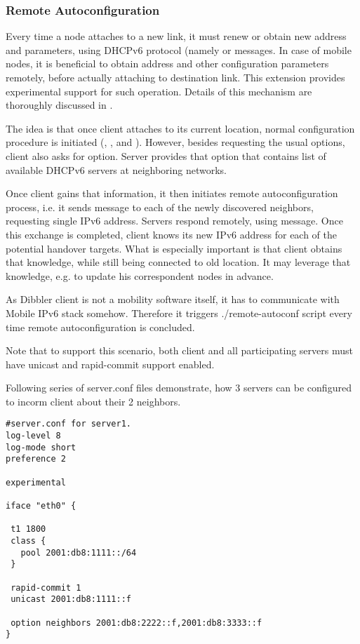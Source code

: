 \subsubsection{Remote Autoconfiguration}
\label{feature-remote-autoconf}
Every time a node attaches to a new link, it must renew or
obtain new address and parameters, using DHCPv6 protocol (namely
 or  messages.  In case of mobile nodes,
it is beneficial to obtain address and other  configuration parameters
remotely, before actually attaching to destination link.  This
extension provides experimental support for such operation.
Details of this mechanism are thoroughly discussed in \cite{phd,
  draft-remote-autoconf, networks2010, atnac2010}.

The idea is that once client attaches to its current location, normal
configuration procedure is initiated (, ,
 and ). However, besides requesting the usual
options, client also asks for  option. Server provides
that option that contains list of available DHCPv6 servers at
neighboring networks.

Once client gains that information, it then initiates remote
autoconfiguration process, i.e. it sends  message to each
of the newly discovered neighbors, requesting single IPv6
address. Servers respond remotely, using  message. Once
this exchange is completed, client knows its new IPv6 address for each
of the potential handover targets. What is especially important is
that client obtains that knowledge, while still being connected to old
location. It may leverage that knowledge, e.g. to update his
correspondent nodes in advance.

As Dibbler client is not a mobility software itself, it has to
communicate with Mobile IPv6 stack somehow. Therefore it triggers
./remote-autoconf script every time remote autoconfiguration is
concluded.

Note that to support this scenario, both client and all participating
servers must have unicast and rapid-commit support enabled.

Following series of server.conf files demonstrate, how 3 servers can
be configured to incorm client about their 2 neighbors.

\begin{lstlisting}
#server.conf for server1.
log-level 8
log-mode short
preference 2

experimental

iface "eth0" {

 t1 1800
 class {
   pool 2001:db8:1111::/64
 }

 rapid-commit 1
 unicast 2001:db8:1111::f

 option neighbors 2001:db8:2222::f,2001:db8:3333::f
}
\end{lstlisting}

